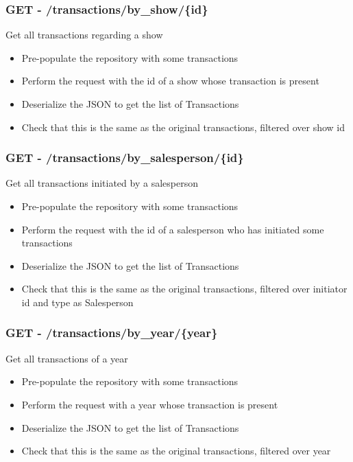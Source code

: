 \documentclass[]{article}
\providecommand{\tightlist}{%
  \setlength{\itemsep}{0pt}\setlength{\parskip}{0pt}}
\begin{document}
\hypertarget{get---transactionsby_showid}{%
\subsubsection{GET -
/transactions/by\_show/\{id\}}\label{get---transactionsby_showid}}

Get all transactions regarding a show

\begin{itemize}
\tightlist
\item
  Pre-populate the repository with some transactions
\item
  Perform the request with the id of a show whose transaction is present
\item
  Deserialize the JSON to get the list of Transactions
\item
  Check that this is the same as the original transactions, filtered
  over show id
\end{itemize}

\hypertarget{get---transactionsby_salespersonid}{%
\subsubsection{GET -
/transactions/by\_salesperson/\{id\}}\label{get---transactionsby_salespersonid}}

Get all transactions initiated by a salesperson

\begin{itemize}
\tightlist
\item
  Pre-populate the repository with some transactions
\item
  Perform the request with the id of a salesperson who has initiated
  some transactions
\item
  Deserialize the JSON to get the list of Transactions
\item
  Check that this is the same as the original transactions, filtered
  over initiator id and type as Salesperson
\end{itemize}

\hypertarget{get---transactionsby_yearyear}{%
\subsubsection{GET -
/transactions/by\_year/\{year\}}\label{get---transactionsby_yearyear}}

Get all transactions of a year

\begin{itemize}
\tightlist
\item
  Pre-populate the repository with some transactions
\item
  Perform the request with a year whose transaction is present
\item
  Deserialize the JSON to get the list of Transactions
\item
  Check that this is the same as the original transactions, filtered
  over year
\end{itemize}
\end{document}
